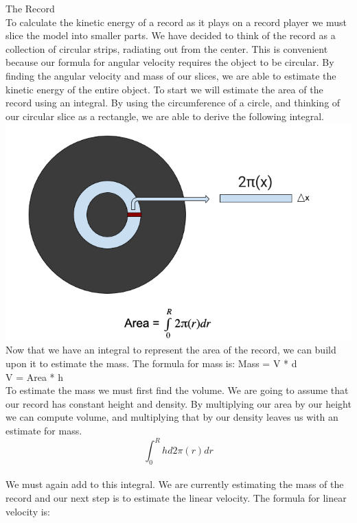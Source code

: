 \documentclass[a4paper, 11pt, oneside]{book} %
\begin{document}
{\LARGE The Record \\} %
\vspace{0.5\baselineskip} %
To calculate the kinetic energy of a record as it plays on a record player we must slice the model into smaller parts. We have decided to think of the record as a collection of circular strips, radiating out from the center. This is convenient because our formula for angular velocity requires the object to be circular. By finding the angular velocity and mass of our slices, we are able to estimate the kinetic energy of the entire object. 
To start we will estimate the area of the record using an integral. By using the circumference of a circle, and thinking of our circular slice as a rectangle, we are able to derive the following integral.
\includegraphics[scale=0.38]{record1}\\
Now that we have an integral to represent the area of the record, we can build upon it to estimate the mass. The formula for mass is: \newline
{\large {Mass = V * d\\} }
{\large {V =  Area * h\\} }
To estimate the mass we must first find the volume. We are going to assume that our record has constant height and density. By multiplying our area by our height we can compute volume, and multiplying that by our density leaves us with an estimate for mass. \newline
{\large {$$\int_{0}^{R} hd2\pi(r)dr$$\\} }
We must again add to this integral. We are currently estimating the mass of the record and our next step is to estimate the linear velocity. The formula for linear velocity is: \newline
\end{document}
